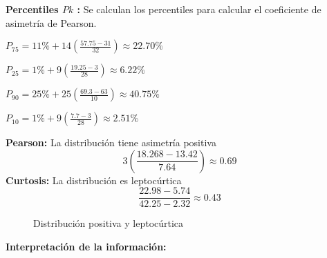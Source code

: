 \vspace{-0.5cm}
\textbf{Percentiles $Pk$ :} Se calculan los percentiles para calcular el coeficiente de asimetría de Pearson.
\begin{multicols}{2}

	$P_{75} = 11\% + 14\left(\frac{57.75 - 31}{32}\right) \approx 22.70\%$

	$P_{25} = 1\% + 9\left(\frac{19.25 - 3}{28}\right) \approx 6.22\%$

	$P_{90} = 25\% + 25\left(\frac{69.3 - 63}{10}\right) \approx 40.75\%$

	$P_{10} = 1\% + 9\left(\frac{7.7 - 3}{28}\right) \approx 2.51\%$
\end{multicols}
\begin{multicols}{2}
	\textbf{Pearson:} La distribución tiene asimetría positiva
	\begin{equation*}
		3\left(\frac{18.268-13.42}{7.64}\right) \approx 0.69
	\end{equation*}
	\textbf{Curtosis:} La distribución es leptocúrtica
	\begin{equation*}
		\frac{22.98-5.74}{42.25-2.32} \approx 0.43
	\end{equation*}
\end{multicols}
\vspace{-0.5cm}
\begin{figure}[H]
	\centering
	\hspace*{-1.2cm}
	\vspace{-0.4cm}
	\caption{Distribución positiva y leptocúrtica}
\end{figure}
\vspace{-0.8cm}
\textbf{Interpretación de la información:}


